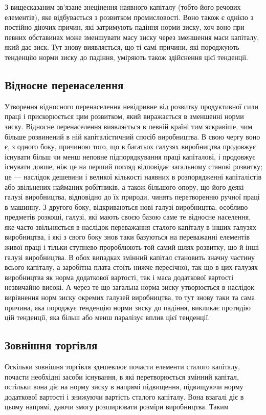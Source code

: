 
З вищесказаним зв’язане знецінення наявного капіталу (тобто його речових елементів), яке
відбувається з розвитком промисловості. Воно також є однією з постійно діючих причин, які затримують
падіння норми зиску, хоч воно при певних обставинах може зменшувати масу зиску через зменшення маси
капіталу, який дає зиск. Тут знову виявляється, що ті самі причини, які породжують тенденцію норми
зиску до падіння, уміряють також здійснення цієї тенденції.

\subsection{Відносне перенаселення}
Утворення відносного перенаселення невідривне від розвитку продуктивної сили праці і прискорюється
цим розвитком, який виражається в зменшенні норми зиску. Відносне перенаселення виявляється в певній
країні тим яскравіше, чим більше розвинений в ній капіталістичний спосіб виробництва. В свою чергу
воно є, з одного боку, причиною того, що в багатьох галузях виробництва продовжує існувати більш чи
менш неповне підпорядкування праці капіталові, і продовжує існувати довше, ніж це на перший погляд
відповідає загальному станові розвитку; це — наслідок дешевини і великої кількості наявних в
розпорядженні капіталістів або звільнених найманих робітників, а також більшого опору, що його деякі
галузі виробництва, відповідно до
їх природи, чинять перетворенню ручної праці в машинну. З другого боку, відкриваються нові галузі
виробництва, особливо предметів розкоші, галузі, які мають своєю базою саме те відносне населення,
яке часто звільняється в наслідок переважання сталого капіталу в інших галузях виробництва, і які з
свого боку знов таки базуються на переважанні елементів живої праці і тільки ступнево пророблюють
той самий шлях розвитку, що й інші галузі виробництва. В обох випадках змінний капітал становить
значну частину всього капіталу, а заробітна плата стоїть нижче пересічної, так що в цих галузях
виробництва як норма додаткової вартості, так і маса додаткової вартості незвичайно високі. А через
те що загальна норма зиску утворюється в наслідок вирівнення норм зиску окремих галузей виробництва,
то
тут знову таки та сама причина, яка породжує тенденцію норми зиску до падіння, викликає протидію цій
тенденції, яка більш або менш паралізує вплив цієї тенденції.

\subsection{Зовнішня торгівля}
Оскільки зовнішня торгівля здешевлює почасти елементи сталого капіталу, почасти необхідні засоби
існування, в які перетворюється змінний капітал, остільки вона діє на норму зиску в напрямі
підвищення, підвищуючи норму додаткової вартості і знижуючи вартість сталого капіталу. Вона взагалі
діє в цьому напрямі, даючи змогу розширювати розміри виробництва. Таким
\parbreak{}  %
